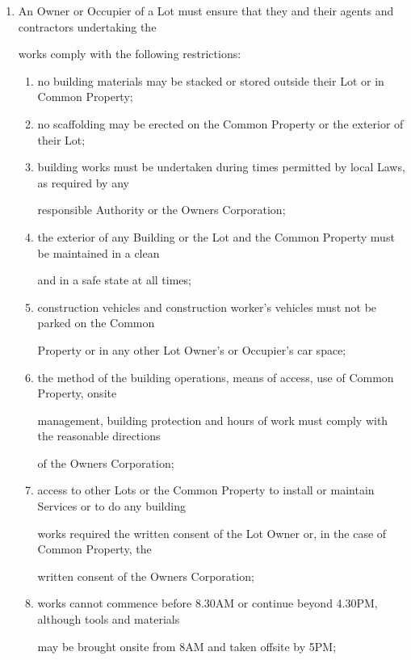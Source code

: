 \documentclass{article}
\begin{document}
\begin{enumerate}[label=\arabic*.]
\begin{enumerate}[label=\arabic{enumi}.\arabic*.]
\begin{enumerate}[label=(\arabic*)]
\item  An Owner or Occupier of a Lot must ensure that they and their agents and contractors undertaking the 

works comply with the following restrictions: 

\begin{enumerate}[label=(\alph*)]
\item  no building materials may be stacked or stored outside their Lot or in Common Property; 

\item  no scaffolding may be erected on the Common Property or the exterior of their Lot; 

\item  building works must be undertaken during times permitted by local Laws, as required by any 

responsible Authority or the Owners Corporation; 

\item  the exterior of any Building or the Lot and the Common Property must be maintained in a clean 

and in a safe state at all times; 

\item  construction vehicles and construction worker’s vehicles must not be parked on the Common 

Property or in any other Lot Owner’s or Occupier’s car space; 

\item  the method of the building operations, means of access, use of Common Property, onsite 

management, building protection and hours of work must comply with the reasonable directions 

of the Owners Corporation; 

\item  access to other Lots or the Common Property to install or maintain Services or to do any building 

works required the written consent of the Lot Owner or, in the case of Common Property, the 

written consent of the Owners Corporation; 

\item  works cannot commence before 8.30AM or continue beyond 4.30PM, although tools and materials 

may be brought onsite from 8AM and taken offsite by 5PM; 


\end{enumerate}
\end{enumerate}
\end{enumerate}
\end{enumerate}
\end{document}
